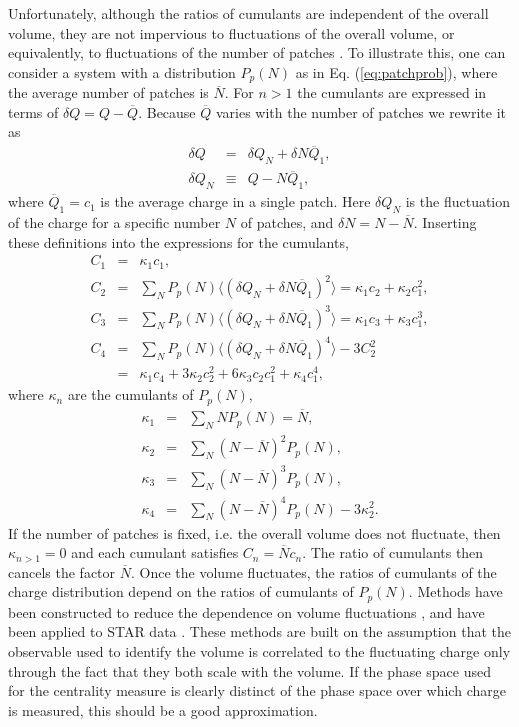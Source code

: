 Unfortunately, although the ratios of cumulants are independent of the overall volume, they are not impervious to fluctuations of the overall volume, or equivalently, to fluctuations of the number of patches \cite{Gazdzicki:1992ri,Gorenstein:2011vq,Gazdzicki:2013ana}. To illustrate this, one can consider a system with a distribution $P_p(N)$  as in Eq. (\ref{eq:patchprob}), where the average number of patches is $\overline{N}$. For $n>1$ the cumulants are expressed in terms of $\delta Q=Q-\overline{Q}$. Because $\overline{Q}$ varies with the number of patches we rewrite it as
\begin{eqnarray}
\delta Q&=&\delta Q_N+\delta N\overline{Q}_1,\\
\nonumber
\delta Q_N&\equiv&Q-N\overline{Q}_1,
\end{eqnarray}
where $\overline{Q}_1=c_1$ is the average charge in a single patch. Here $\delta Q_N$ is the fluctuation of the charge for a specific number $N$ of patches, and $\delta N=N-\overline{N}$. Inserting these definitions into the expressions for the cumulants,
\begin{eqnarray}\label{eq:volfluc}
C_1&=&\kappa_1c_1,\\
\nonumber
C_2&=&\sum_NP_p(N) \langle(\delta Q_N+\delta N\overline{Q}_1)^2\rangle=\kappa_1c_2+\kappa_2c_1^2,\\
\nonumber
C_3&=&\sum_NP_p(N) \langle(\delta Q_N+\delta N\overline{Q}_1)^3\rangle=\kappa_1c_3+\kappa_3c_1^3,\\
\nonumber
C_4&=&\sum_NP_p(N) \langle(\delta Q_N+\delta N\overline{Q}_1)^4\rangle-3C_2^2\\
\nonumber
&=&\kappa_1c_4+3\kappa_2c_2^2+6\kappa_3c_2c_1^2+\kappa_4c_1^4,
\end{eqnarray}
where $\kappa_n$ are the cumulants of $P_p(N)$,
\begin{eqnarray}\label{eq:kappadef2}
\kappa_1&=&\sum_N NP_p(N)=\overline{N},\\
\nonumber
\kappa_2&=&\sum_N (N-\overline{N})^2P_p(N),\\
\nonumber
\kappa_3&=&\sum_N (N-\overline{N})^3P_p(N),\\
\nonumber
\kappa_4&=&\sum_N (N-\overline{N})^4P_p(N)-3\kappa_2^2.
\end{eqnarray}
If the number of patches is fixed, i.e. the overall volume does not fluctuate, then $\kappa_{n>1}=0$ and each cumulant satisfies $C_n=\overline{N} c_n$. The ratio of cumulants then cancels the factor $\overline{N}$. 
Once the volume fluctuates, the ratios of cumulants of the charge distribution depend on the ratios of cumulants of $P_p(N)$. Methods have been constructed to reduce the dependence on volume fluctuations \cite{Begun:2014boa,Gazdzicki:2013ana,Gorenstein:2011vq,Sangaline:2015bma}, and have been applied to STAR data \cite{Luo:2017faz,Esumi:2020xdo}. These methods are built on the assumption that the observable used to identify the volume is correlated to the fluctuating charge only through the fact that they both scale with the volume. If the phase space used for the centrality measure is clearly distinct of the phase space over which charge is measured, this should be a good approximation. 

